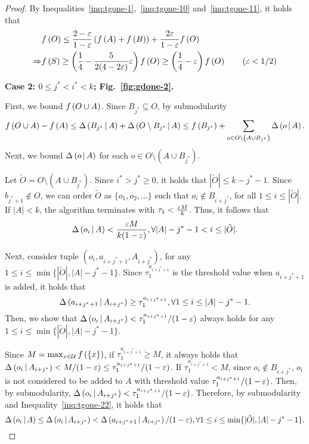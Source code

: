 \begin{proof}
By Inequalities~\eqref{inq:tgone-1},~\eqref{inq:tgone-10} and~\eqref{inq:tgone-11},
it holds that
\begin{align*}
&\ff{O} \le \frac{2-\epsi}{1-\epsi}\left(\ff{A} + \ff{B}\right) + \frac{2\epsi}{1-\epsi}\ff{O}\\
\Rightarrow &\ff{S} \ge \left(\frac{1}{4} - \frac{5}{2(4-2\epsi)}\epsi\right)\ff{O}
\ge \left(\frac{1}{4}-\epsi\right)\ff{O}\tag{$\epsi < 1/2$}
\end{align*}

\textbf{Case 2: $0\le j^* < i^* < k$; Fig.~\ref{fig:gdone-2}.}

First, we bound $f \left( O\cup A \right)$. 
Since $B_{j^*} \subseteq O$, by submodularity
\begin{equation}\label{inq:tgone-20}
f \left( O\cup A \right) - f \left( A \right) \le \Delta \left( B_{j^*} \, \middle| \, A \right) + \Delta \left( O\setminus B_{j^*} \, \middle| \, A \right)
\le f \left( B_{j^*} \right)+ \sum_{o\in O\setminus \left(A\cup B_{j^*}\right)}\Delta \left( o \, \middle| \, A \right).
\end{equation}
Next, we bound $\Delta \left( o \, \middle| \, A \right)$ for each $o\in O\setminus \left(A\cup B_{j^*}\right)$.

Let $\tilde{O} = O\setminus \left(A \cup B_{j^*}\right)$.
Since $i^* > j^*\ge 0$, 
it holds that $|\tilde{O}|\le k-j^*-1$.
Since $b_{j^*+1}\not \in O$,
we can order $\tilde{O}$ as $\{o_1, o_2, \ldots\}$ such that $o_i \not \in B_{i+j^*}$,
for all $1\le i \le |\tilde{O}|$.
If $|A| < k$, the algorithm terminates with $\tau_1 < \frac{\varepsilon M}{k}$.
Thus, it follows that
\begin{equation}\label{inq:tgone-21}
\Delta \left( o_i \, \middle| \, A \right) < \frac{\varepsilon M}{k(1-\varepsilon)}, \forall |A|-j^*-1 < i \le |\tilde{O}|.
\end{equation}

Next, consider tuple $(o_i, a_{i + j^*+1}, A_{i+j^*})$,
for any $1\le i \le \min\{|\tilde{O}|, |A|-j^*-1\}$.
Since $\tau_1^{a_{i + j^*+1}}$ is the threshold value when $a_{i + j^*+1}$ is added,
it holds that 
\begin{equation}\label{inq:tgone-22}
\Delta \left( a_{i + j^*+1} \, \middle| \, A_{i+j^*} \right) \ge \tau_1^{a_{i + j^*+1}},
\forall 1\le i\le |A| - j^*-1.
\end{equation}
Then, we show that $\Delta \left( o_i \, \middle| \, A_{i+j^*} \right) < \tau_1^{a_{i + j^*+1}}/(1-\varepsilon)$ always holds
for any $1\le i \le \min\{|\tilde{O}|, |A|-j^*-1\}$.

Since $M = \max_{x\in \mathcal U}f \left( \{x\} \right)$,
if $\tau_1^{a_{i + j^*+1}} \ge M$,
it always holds that $\Delta \left( o_i \, \middle| \, A_{i+j^*} \right) < M/(1-\varepsilon)\le \tau_1^{a_{i + j^*+1}}/(1-\varepsilon)$.
If $\tau_1^{a_{i + j^*+1}} < M$, 
since $o_i \not \in B_{i+j^*}$,
$o_i$ is not considered to be added to $A$ with threshold value $\tau_1^{a_{i + j^*+1}}/(1-\varepsilon)$.
Then, by submodularity,
$\Delta \left( o_i \, \middle| \, A_{i+j^*} \right) < \tau_1^{a_{i + j^*+1}}/(1-\varepsilon)$.
Therefore, by submodularity and Inequality~\eqref{inq:tgone-22},
it holds that 
\begin{equation}\label{inq:tgone-23}
\Delta \left( o_i \, \middle| \, A \right) \le \Delta \left( o_i \, \middle| \, A_{i+j^*} \right) < \Delta \left( a_{i + j^*+1} \, \middle| \, A_{i+j^*} \right)/(1-\varepsilon), \forall 1\le i \le \min\{|\tilde{O}|, |A|-j^*-1\}.
\end{equation}


\end{proof}
